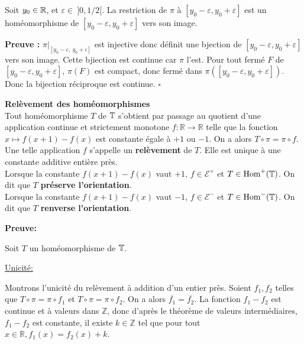 \begin{lemma}\label{préli relèvement}
	Soit $y_0 \in {\mathbb{R}}$, et $\varepsilon \in \ ]0,1/2[$. La restriction de $\pi$ à $[y_0-\varepsilon, y_0 +\varepsilon]$ est un homéomorphisme de $[y_0-\varepsilon, y_0 +\varepsilon]$ vers son image.
\end{lemma}

	\textbf{Preuve :}
	$\pi|_{[y_0-\varepsilon,\ y_0 +\varepsilon]}$ est injective donc définit une bjection de $[y_0-\varepsilon, y_0 +\varepsilon]$ vers son image. Cette bjiection est continue car $\pi$ l'est. Pour tout fermé $F$ de $[y_0-\varepsilon, y_0 +\varepsilon]$, $\pi(F)$ est compact, donc fermé dans $\pi([y_0-\varepsilon, y_0 +\varepsilon])$. Donc la bijection réciproque est continue. \hfill $\square$\\






\begin{thmdefi}\label{relèvement des homémorphismes} \textbf{Relèvement des homéomorphismes}\\
	Tout homéomorphisme $T$ de ${\mathbb{T}}$ s'obtient par passage au quotient d'une application continue et strictement monotone $f:\mathbb{R} \to \mathbb{R}$ telle que la fonction $x \mapsto f(x+1) -f(x)$ est constante égale à $+1$ ou $-1$. On a alors $T \circ \pi = \pi \circ f$. Une telle application $f$ s'appelle un \textbf{relèvement} de $T$. Elle est unique à une constante additive entière près.\\
	Lorsque la constante $f(x+1)-f(x)$ vaut $+1$, $f \in \mathcal{E}^+$ et $T \in \mathrm{Hom}^+({\mathbb{T}})$. On dit que $T$ \textbf{préserve l'orientation}.\\
	Lorsque la constante $f(x+1)-f(x)$ vaut $-1$, $f \in \mathcal{E}^-$ et $T \in \mathrm{Hom}^-({\mathbb{T}})$. On dit que $T$ \textbf{renverse l'orientation}.
\end{thmdefi}

	\textbf{Preuve:}
	\par Soit $T$ un homéomorphisme de ${\mathbb{T}}$.
	\par \underline{Unicité:}
	\par Montrons l'unicité du relèvement à addition d'un entier près. Soient $f_1, f_2$ telles que $T \circ \pi = \pi \circ f_1$ et $T \circ \pi = \pi \circ f_2$. On a alors $\overline{f_1}=\overline{f_2}$. La fonction $f_1 - f_2$ est continue et à valeurs dans $\mathbb{Z}$, donc d'après le théorème de valeurs intermédiaires, $f_1 - f_2$ est constante, il existe $k \in \mathbb{Z}$ tel que pour tout $x \in \mathbb{R}, f_1(x)=f_2(x)+k$.\\

